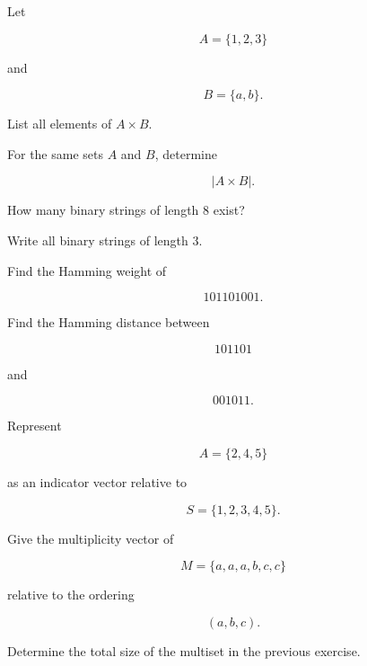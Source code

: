 \begin{exercise}[1]
Let

\[
A=\{1,2,3\}
\]

and

\[
B=\{a,b\}.
\]

List all elements of \(A\times B\).
\end{exercise}

\begin{exercise}[1]
For the same sets \(A\) and \(B\), determine

\[
|A\times B|.
\]
\end{exercise}

\begin{exercise}[1]
How many binary strings of length \(8\) exist?
\end{exercise}

\begin{exercise}[1]
Write all binary strings of length \(3\).
\end{exercise}

\begin{exercise}[1]
Find the Hamming weight of

\[
101101001.
\]
\end{exercise}

\begin{exercise}[1]
Find the Hamming distance between

\[
101101
\]

and

\[
001011.
\]
\end{exercise}

\begin{exercise}[1]
Represent

\[
A=\{2,4,5\}
\]

as an indicator vector relative to

\[
S=\{1,2,3,4,5\}.
\]
\end{exercise}

\begin{exercise}[1]
Give the multiplicity vector of

\[
M=\{a,a,a,b,c,c\}
\]

relative to the ordering

\[
(a,b,c).
\]
\end{exercise}

\begin{exercise}[1]
Determine the total size of the multiset in the previous exercise.
\end{exercise}

